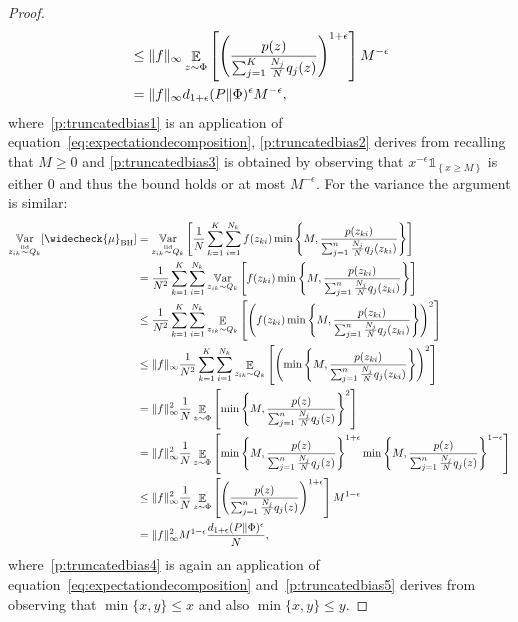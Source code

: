\documentclass{article}
\begin{document}
\begin{proof}
\begin{align}
    & \le \|f\|_{\infty} \mathop{\mathbb{E}}_{z \sim \Phi} \left[  \left(  \frac{p(z)}{\sum_{j=1}^K \frac{N_j}{N} q_j(z)} \right)^{1+\epsilon} \right] M^{-\epsilon} \label{p:truncatedbias3}\\
        & = \|f\|_{\infty} d_{1+\epsilon}(P \| \Phi)^{\epsilon}  M^{-\epsilon},\notag
    \end{align}
    where~\eqref{p:truncatedbias1} is an application of equation~\eqref{eq:expectationdecomposition}, \eqref{p:truncatedbias2} derives from recalling that $M\ge 0$ and \eqref{p:truncatedbias3} is obtained by observing that $ x^{-\epsilon} \mathds{1}_{\left\{ x \ge M \right\} }$ is either $0$ and thus the bound holds or at most $M^{-\epsilon}$.
    For the variance the argument is similar:
    \begin{align}
    \Var_{z_{ik} \simiid Q_k} [\widecheck{\mu}_{\text{BH}}]&  = \Var_{z_{ik} \simiid Q_k} \left[ \frac{1}{N} \sum_{k=1}^K \sum_{i=1}^{N_k}  f(z_{ki}) \min \left\{ M, \frac{p(z_{ki})}{\sum_{j=1}^n \frac{N_j}{N} q_j(z_{ki})} \right\} \right] \notag\\
    & = \frac{1}{N^2} \sum_{k=1}^K \sum_{i=1}^{N_k} \Var_{z_{ik} \sim Q_k} \left[   f(z_{ki}) \min \left\{ M, \frac{p(z_{ki})}{\sum_{j=1}^n \frac{N_j}{N} q_j(z_{ki})} \right\} \right] \notag\\
    & \le \frac{1}{N^2} \sum_{k=1}^K \sum_{i=1}^{N_k} \Exp_{z_{ik} \sim Q_k} \left[   \left( f(z_{ki})  \min \left\{ M, \frac{p(z_{ki})}{\sum_{j=1}^n \frac{N_j}{N} q_j(z_{ki})} \right\} \right)^2 \right]\notag\\
    & \le \|f\|_{\infty} \frac{1}{N^2} \sum_{k=1}^K \sum_{i=1}^{N_k} \Exp_{z_{ik} \sim Q_k} \left[   \left( \min \left\{ M, \frac{p(z_{ki})}{\sum_{j=1}^n \frac{N_j}{N} q_j(z_{ki})} \right\} \right)^2 \right]\notag\\
    & = \|f\|_{\infty}^2 \frac{1}{N} \Exp_{z \sim \Phi} \left[ \min \left\{ M, \frac{p(z)}{\sum_{j=1}^n \frac{N_j}{N} q_j(z)} \right\}^2 \right] \label{p:truncatedbias4}\\
    & = \|f\|_{\infty}^2 \frac{1}{N} \Exp_{z \sim \Phi} \left[ \min \left\{ M, \frac{p(z)}{\sum_{j=1}^n \frac{N_j}{N} q_j(z)} \right\}^{1+\epsilon} \min \left\{ M, \frac{p(z)}{\sum_{j=1}^n \frac{N_j}{N} q_j(z)} \right\}^{1-\epsilon}  \right]\notag\\
    & \le \|f\|_{\infty}^2 \frac{1}{N} \Exp_{z \sim \Phi} \left[ \left( \frac{p(z)}{\sum_{j=1}^n \frac{N_j}{N} q_j(z)} \right)^{1+\epsilon}  \right] M^{1-\epsilon} \label{p:truncatedbias5}\\
    &= \|f\|_{\infty}^2 M^{1-\epsilon} \frac{d_{1+\epsilon}(P\|\Phi)^{\epsilon}}{N} ,\notag\\
    \end{align}
    where~\eqref{p:truncatedbias4}  is again an application of equation~\eqref{eq:expectationdecomposition} and~\ref{p:truncatedbias5} derives from observing that $\min\{x,y\} \le x$ and also $\min\{x,y\} \le y$.
\end{proof}
\end{document}
